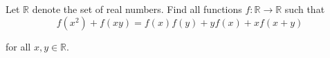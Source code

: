Let $\mathbb{R}$ denote the set of real numbers. Find all functions $f:\mathbb{R}\rightarrow\mathbb{R}$ such that\[f(x^2)+f(xy)=f(x)f(y)+yf(x)+xf(x+y)\]

for all $x,y\in\mathbb{R}$.